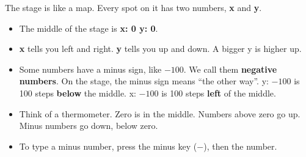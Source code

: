 \begin{tip}
The stage is like a map. Every spot on it has two numbers, \textbf{x} and \textbf{y}.
\begin{itemize}[leftmargin=1.2em,itemsep=1pt]
  \item The middle of the stage is \textbf{x: 0 y: 0}.
  \item \textbf{x} tells you left and right. \textbf{y} tells you up and down. A bigger y is higher up.
  \item Some numbers have a minus sign, like $-100$. We call them \textbf{negative numbers}. On the stage, the minus sign means \enquote{the other way}. y: $-100$ is 100 steps \textbf{below} the middle. x: $-100$ is 100 steps \textbf{left} of the middle.
  \item Think of a thermometer. Zero is in the middle. Numbers above zero go up. Minus numbers go down, below zero.
  \item To type a minus number, press the minus key ($-$), then the number.
\end{itemize}
\begin{center}
\end{center}
\end{tip}

